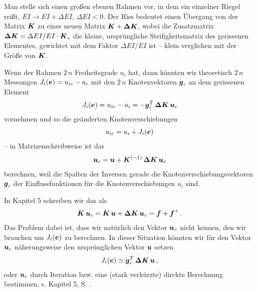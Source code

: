Man stelle sich einen gro{\ss}en ebenen Rahmen vor, in dem ein einzelner Riegel rei{\ss}t, $EI \to EI + \Delta EI$, $\Delta EI < 0$. Der Riss bedeutet einen \"{U}bergang von der Matrix $\mbox{\boldmath $K$}$ zu einer neuen Matrix $\mbox{\boldmath $K$} + \mbox{\boldmath $\Delta$} \mbox{\boldmath $K$}$, wobei die Zusatzmatrix $\mbox{\boldmath $\Delta$} \mbox{\boldmath $K$} = \Delta EI/EI \cdot \mbox{\boldmath $K$}_e$ die kleine, urspr\"{u}ngliche Steifigkeitsmatrix des gerissenen Elementes, gewichtet mit dem Faktor $\Delta EI/EI$ ist -- klein verglichen mit der Gr\"{o}{\ss}e von $\mbox{\boldmath $K$}$.

Wenn der Rahmen $2\,n$ Freiheitsgrade $u_i$ hat, dann k\"{o}nnten wir theoretisch $2\,n$ Messungen $J_i(\mbox{\boldmath $e$}) = u_{ic} - u_i$ mit den $2\,n$ Knotenvektoren $\mbox{\boldmath $g$}_i$ an dem gerissenen Element
\begin{align}
J_i(\mbox{\boldmath $e$}) = u_{ic} - u_i = -\mbox{\boldmath $g$}_i^T\,\mbox{\boldmath $\Delta$}\mbox{\boldmath $K$}\,\mbox{\boldmath $u$}_c
\end{align}
vornehmen und so die ge\"{a}nderten Knotenverschiebungen
\begin{align}
u_{ic} = u_i + J_i(\mbox{\boldmath $e$})
\end{align}
-- in Matrizenschreibweise ist das
\begin{align}\label{Eq161}
\mbox{\boldmath $u$}_c = \mbox{\boldmath $u$} + \mbox{\boldmath $K$}^{(-1)}\,\mbox{\boldmath $\Delta$}\mbox{\boldmath $K$}\,\mbox{\boldmath $u$}_c
\end{align}
berechnen, weil die Spalten der Inversen gerade die Knotenverschiebungsvektoren $\mbox{\boldmath $g$}_i$ der Einflussfunktionen f\"{u}r die Knotenverschiebungen $u_i$ sind.

In Kapitel 5 schreiben wir das als
\begin{align}\label{Eq7}
\mbox{\boldmath $K$}\,\mbox{\boldmath $u$}_c = \mbox{\boldmath $K$}\,\mbox{\boldmath $u$} + \mbox{\boldmath $\Delta$}\mbox{\boldmath $K$}\,\mbox{\boldmath $u$}_c = \mbox{\boldmath $f$} + \mbox{\boldmath $f$}^+\,.
\end{align}
Das Problem dabei ist, dass wir nat\"{u}rlich den Vektor $\mbox{\boldmath $u$}_c$ nicht kennen, den wir brauchen um $J_i(\mbox{\boldmath $e$})$ zu berechnen. In dieser Situation k\"{o}nnten wir f\"{u}r den Vektor $\mbox{\boldmath $u$}_c$ n\"{a}herungsweise den urspr\"{u}nglichen Vektor $\mbox{\boldmath $u$}$ setzen
\begin{align}
J_i(\mbox{\boldmath $e$})  \simeq \mbox{\boldmath $g$}_i^T\,\mbox{\boldmath $\Delta$}\mbox{\boldmath $K$}\,\mbox{\boldmath $u$}\,,
\end{align}
oder $\mbox{\boldmath $u$}_c$ durch Iteration bzw. eine (stark verk\"{u}rzte) direkte Berechnung bestimmen, s. Kapitel 5, S. \pageref{Eq59}. \\

